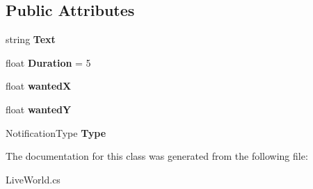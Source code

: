 \subsection*{Public Attributes}
\begin{DoxyCompactItemize}
\item 
\hypertarget{class_live_world_1_1_l_w_interface_1_1_notification_a3cb9be7169345c370db00aec68a203f2}{}string {\bfseries Text}\label{class_live_world_1_1_l_w_interface_1_1_notification_a3cb9be7169345c370db00aec68a203f2}

\item 
\hypertarget{class_live_world_1_1_l_w_interface_1_1_notification_a0718f7519e0db432e92e4112612d6df3}{}float {\bfseries Duration} = 5\label{class_live_world_1_1_l_w_interface_1_1_notification_a0718f7519e0db432e92e4112612d6df3}

\item 
\hypertarget{class_live_world_1_1_l_w_interface_1_1_notification_a25bac4d729f8b53a5fd326eaea799eac}{}float {\bfseries wanted\+X}\label{class_live_world_1_1_l_w_interface_1_1_notification_a25bac4d729f8b53a5fd326eaea799eac}

\item 
\hypertarget{class_live_world_1_1_l_w_interface_1_1_notification_a1bae44fd4d2e6f473e5679e2b6285210}{}float {\bfseries wanted\+Y}\label{class_live_world_1_1_l_w_interface_1_1_notification_a1bae44fd4d2e6f473e5679e2b6285210}

\item 
\hypertarget{class_live_world_1_1_l_w_interface_1_1_notification_adf0d8c772fe25aa51e4c91dc0a858120}{}Notification\+Type {\bfseries Type}\label{class_live_world_1_1_l_w_interface_1_1_notification_adf0d8c772fe25aa51e4c91dc0a858120}

\end{DoxyCompactItemize}


The documentation for this class was generated from the following file\+:\begin{DoxyCompactItemize}
\item 
Live\+World.\+cs\end{DoxyCompactItemize}
